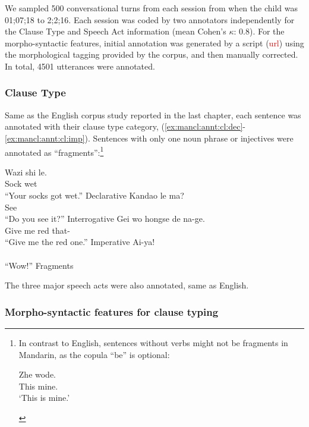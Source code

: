 We sampled 500 conversational turns from each session from when the child was 01;07;18 to 2;2;16. Each session was coded by two annotators independently for the Clause Type and Speech Act information (mean Cohen's $\kappa$: 0.8). For the morpho-syntactic features, initial annotation was generated by a script (\textcolor{red}{url}) using the morphological tagging provided by the corpus, and then manually corrected. In total, 4501 utterances were annotated. 

\subsubsection{Clause Type}

Same as the English corpus study reported in the last chapter, each sentence was annotated with their clause type category, \diis{} (\ref{ex:mancl:annt:cl:dec}-\ref{ex:mancl:annt:cl:imp}). Sentences with only one noun phrase or injectives were annotated as ``fragments'':\footnote{In contrast to English, sentences without verbs might not be fragments in Mandarin, as the copula  ``be'' is optional:
\begin{xlist}
\ex 
\gll Zhe wode.\\
This mine.\\
\trans `This is mine.'
\end{xlist}
}

\bxl \label{ex:mancl:annt:cl:dec}
\gll Wazi shi le.\\
Sock wet \Sfp{}\\
``Your socks got wet.'' \hfill Declarative
\ex \label{ex:mancl:annt:cl:int}
\gll Kandao le ma?\\
See \Asp{} \Sfp{}\\
\trans``Do you see it?''  \hfill Interrogative
\ex \label{ex:mancl:annt:cl:imp}
\gll Gei wo hongse de na-ge.\\
Give me red  that-\Cl{}\\
\trans``Give me the red one.'' \hfill Imperative
\ex \label{ex:mancl:annt:cl:frag}
\gll Ai-ya!\\
 \\
\trans ``Wow!'' \hfill Fragments
\exl
\eex

The three major speech acts were also annotated, same as English.

\subsubsection{Morpho-syntactic features for clause typing}

